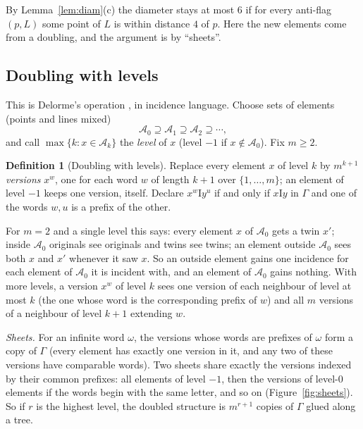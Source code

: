 \documentclass[11pt]{amsart}
\theoremstyle{definition}
\newtheorem{definition}[theorem]{Definition}
\theoremstyle{remark}
\newcommand{\I}{\mathrel{\mathrm{I}}}
\newcommand{\cA}{\mathcal{A}}
\begin{document}
By Lemma~\ref{lem:diam}(c) the diameter stays at most $6$ if for every anti-flag $(p,L)$ some point of $L$ is within distance $4$ of $p$. Here the new elements come from a doubling, and the argument is by ``sheets''.

\subsection{Doubling with levels}\label{ssec:levels}
This is Delorme's operation \cite[\S7]{D85a}, in incidence language. Choose sets of elements (points and lines mixed)
\[
\cA_0\supseteq\cA_1\supseteq\cA_2\supseteq\cdots,
\]
and call $\max\{k: x\in\cA_k\}$ the \emph{level} of $x$ (level $-1$ if $x\notin\cA_0$). Fix $m\ge2$.

\begin{definition}[Doubling with levels]\label{def:levels}
Replace every element $x$ of level $k$ by $m^{k+1}$ \emph{versions} $x^w$, one for each word $w$ of length $k+1$ over $\{1,\dots,m\}$; an element of level $-1$ keeps one version, itself. Declare $x^w\I y^u$ if and only if $x\I y$ in $\Gamma$ and one of the words $w,u$ is a prefix of the other.
\end{definition}

For $m=2$ and a single level this says: every element $x$ of $\cA_0$ gets a twin $x'$; inside $\cA_0$ originals see originals and twins see twins; an element outside $\cA_0$ sees both $x$ and $x'$ whenever it saw $x$. So an outside element gains one incidence for each element of $\cA_0$ it is incident with, and an element of $\cA_0$ gains nothing. With more levels, a version $x^w$ of level $k$ sees one version of each neighbour of level at most $k$ (the one whose word is the corresponding prefix of $w$) and all $m$ versions of a neighbour of level $k+1$ extending $w$.

\emph{Sheets.} For an infinite word $\omega$, the versions whose words are prefixes of $\omega$ form a copy of $\Gamma$ (every element has exactly one version in it, and any two of these versions have comparable words). Two sheets share exactly the versions indexed by their common prefixes: all elements of level $-1$, then the versions of level-$0$ elements if the words begin with the same letter, and so on (Figure~\ref{fig:sheets}). So if $r$ is the highest level, the doubled structure is $m^{r+1}$ copies of $\Gamma$ glued along a tree.
\end{document}
